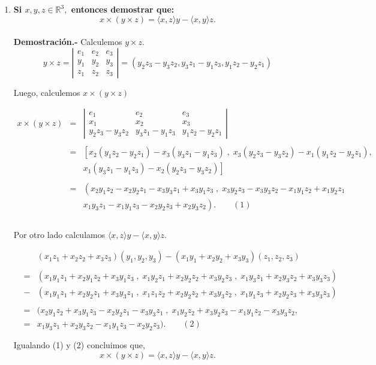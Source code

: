 \begin{enumerate}
    \item \textbf{\boldmath Si $x,y,z \in \mathbb{R}^3,$ entonces demostrar que:
	$$x\times (y \times z) = \langle x,z\rangle y - \langle x,y\rangle z.$$\\
	Demostración.-}\; Calculemos $y\times z$.
	$$y\times z = \left|\begin{array}{ccc}
	    e_1 & e_2 & e_3 \\
	    y_1 & y_2 & y_3 \\
	    z_1 & z_2 & z_3
	\end{array}\right| = \left(y_2z_3-y_3z_2,y_3z_1-y_1z_3, y_1z_2-y_2z_1\right)$$

	Luego, calculemos $x\times (y \times z)$

	$$\begin{array}{rcl}
	    x\times (y\times z) &=& \left|\begin{array}{ccc}
	    e_1 & e_2 & e_3 \\
	    x_1 & x_2 & x_3 \\
	    y_2z_3-y_3z_2 & y_3z_1-y_1z_3 & y_1z_2-y_2z_1
	\end{array}\right|\\\\
	&=& \left[x_2\left(y_1z_2-y_2z_1\right)-x_3\left(y_3z_1-y_1z_3\right)\; , \; x_3\left(y_2z_3-y_3z_2\right)-x_1\left(y_1z_2-y_2z_1\right),\right.\\
	&&\left.x_1\left(y_3z_1-y_1z_3\right)-x_2\left(y_2z_3-y_3z_2\right)\right]\\\\
	&=& \left(x_2y_1z_2-x_2y_2z_1-x_3y_3z_1+x_3y_1z_3\; , \; x_3y_2z_3-x_3y_3z_2-x_1y_1z_2+x_1y_2z_1\right.\\
	&&\left.x_1y_3z_1-x_1y_1z_3-x_2y_2z_3+x_2y_3z_2\right).\qquad (1)\\\\
	\end{array}$$

	Por otro lado calculamos $\langle x,z\rangle y - \langle x,y\rangle z$.

	$$\begin{array}{rcl}
	    &&(x_1z_1+x_2z_2+x_3z_3)(y_1,y_2,y_3)-(x_1y_1+x_2y_2+x_3y_3)(z_1,z_2,z_3)\\\\
	    &=& (x_1y_1z_1+x_2y_1z_2+x_3y_1z_3\; ,\; x_1y_2z_1+x_2y_2z_2+x_3y_2z_3\; , \; x_1y_3z_1+x_2y_3z_2+x_3y_3z_3)\\
	    &-&(x_1y_1z_1+x_2y_2z_1+x_3y_3z_1\; , \; x_1z_1z_2+x_2y_2z_2+x_3y_3z_2\; ,\; x_1y_1z_3+x_2y_2z_3+x_3y_3z_3)\\\\
	    &=&(x_2y_1z_2+x_3y_1z_3-x_2y_2z_1-x_3y_3z_1\; , \; x_1y_2z_2+x_3y_2z_3-x_1y_1z_2-x_3y_3z_2 ,\\
	    &=& x_1y_3z_1+x_2y_3z_2-x_1y_1z_3-x_2y_2z_3). \qquad (2)\\\\
	\end{array}$$
	Igualando (1) y (2) concluimos que,
	$$x\times (y \times z) = \langle x,z\rangle y - \langle x,y\rangle z.$$\\


\end{enumerate}
